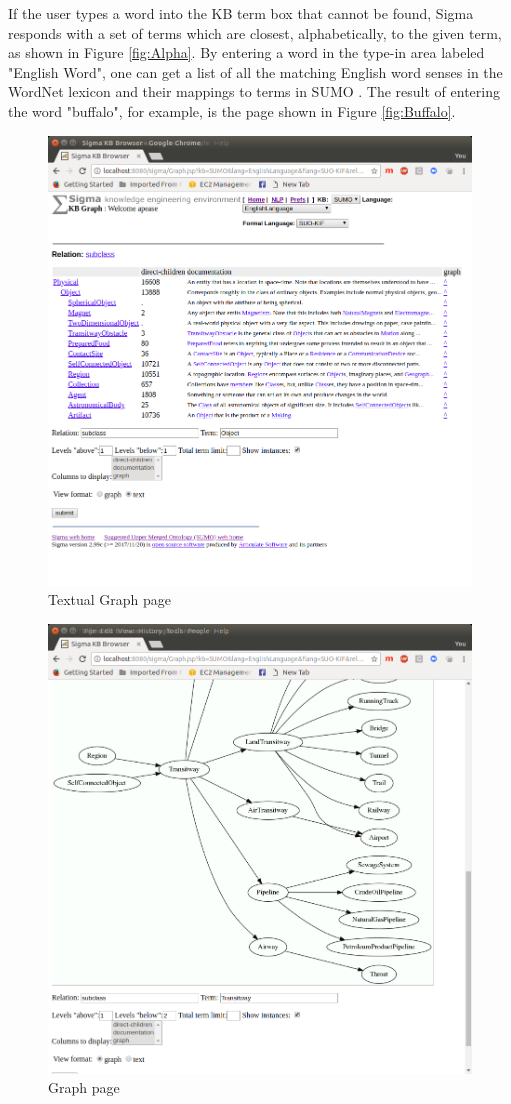 \documentclass{book}
\begin{document}
If the user types a word into the KB term box that cannot be found, Sigma
responds with a set of terms which are closest, alphabetically, to the given
term, as shown in Figure \ref{fig:Alpha}. By entering a word in the type-in area
labeled "English Word", one can get a list of all the matching English word
senses in the WordNet lexicon and their mappings to terms in SUMO
\cite{np03}. The result of entering the word "buffalo", for
example, is the page shown in Figure \ref{fig:Buffalo}. 

\begin{figure}
  \centering
  \includegraphics[width=4.5in]{pictures/Graph.png}
  \caption{Textual Graph page}
  \label{fig:Graph}
\end{figure}

\begin{figure}
  \centering
  \includegraphics[width=4.5in]{pictures/Graphical.png}
  \caption{Graph page}
  \label{fig:Graphical}
\end{figure}
\end{document}
